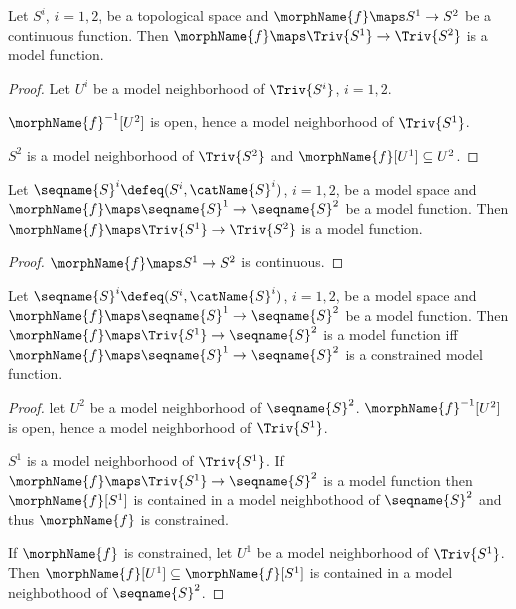 \documentclass{article}
\begin{document}
\begin{lemma}
\label{lem:modfunctriv}
Let $S^i$, $i=1,2$, be a topological space and
$\morphName{f} \maps S^1 \to S^2$ be a continuous function.
Then $\morphName{f} \maps \Triv{S^1} \to \Triv{S^2}$ is a model function.

\begin{proof}
Let $U^i$ be a model neighborhood of $\Triv{S^i}$, $i=1,2$.

$\morphName{f}^{-1}[U^2]$ is open, hence a model neighborhood of
$\Triv{S^1}$.

$S^2$ is a model neighborhood of $\Triv{S^2}$ and
$\morphName{f}[U^1] \subseteq U^2$.
\end{proof}

Let $\seqname{S}^i \defeq (S^i,\catName{S}^i)$, $i=1,2$, be a model
space and $\morphName{f} \maps \seqname{S}^1 \to \seqname{S}^2$ be a
model function. Then $\morphName{f} \maps \Triv{S^1} \to \Triv{S^2}$ is a
model function.

\begin{proof}
$\morphName{f} \maps S^1 \to S^2$ is continuous.
\end{proof}

Let $\seqname{S}^i \defeq (S^i,\catName{S}^i)$, $i=1,2$, be a model
space and $\morphName{f} \maps \seqname{S}^1 \to \seqname{S}^2$ be a
model function. Then $\morphName{f} \maps \Triv{S^1} \to \seqname{S}^2$
is a model function iff
$\morphName{f} \maps \seqname{S}^1 \to \seqname{S}^2$  is a constrained
model function.

\begin{proof}
let $U^2$ be a model neighborhood of $\seqname{S}^2$.
$\morphName{f}^{-1}[U^2]$ is open, hence a model neighborhood of
$\Triv{S^1}$.

$S^1$ is a model neighborhood of $\Triv{S^1}$. If $\morphName{f} \maps
\Triv{S^1} \to \seqname{S}^2$ is a model function then
$\morphName{f}[S^1]$ is contained in a model neighbothood of
$\seqname{S}^2$ and thus $\morphName{f}$ is constrained.

If $\morphName{f}$ is constrained, let $U^1$ be a model neighborhood of
$\Triv{S^1}$. Then $\morphName{f}[U^1] \subseteq \morphName{f}[S^1]$ is
contained in a model neighbothood of $\seqname{S}^2$.
\end{proof}
\end{lemma}
\end{document}
